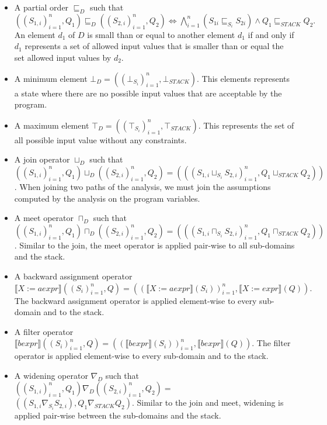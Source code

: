 \documentclass[10pt]{report}
\begin{document}
\begin{itemize}
	\item A partial order $\sqsubseteq_{D}$ such that $ ((S_{1,i})_{i=1}^{n}, Q_{1}) \sqsubseteq_{D} ((S_{2, i})_{i=1}^{n}, Q_{2}) \Longleftrightarrow \bigwedge\limits_{i=1}^{n}(S_{1i} \sqsubseteq_{S_{i}} S_{2i}) \wedge Q_{1} \sqsubseteq_{STACK} Q_{2} .$ An element $ d_{1} $ of $ D $ is small than or equal to another element $ d_{1} $ if and only if $ d_{1} $ represents a set of allowed input values that is smaller than or equal the set allowed input values by $ d_{2} $. 
	\item A minimum element $\bot_{D} = ((\bot_{S_{i}})_{i=1}^{n}, \bot_{STACK})$. This elements represents a state where there are no possible input values that are acceptable by the program. 
	\item A maximum element $\top_{D} =  ((\top_{S_{i}})_{i=1}^{n}, \top_{STACK})$. This represents the set of all possible input value without any constraints. 
	\item A join operator $\sqcup_{D}$ such that $ ((S_{1,i})_{i=1}^{n}, Q_{1}) \sqcup_{D} ((S_{2,i})_{i=1}^{n}, Q_{2}) = (((S_{1,i} \sqcup_{S_{i}} S_{2,i})_{i=1}^{n}, Q_{1} \sqcup_{STACK} Q_{2}))$. When joining two paths of the analysis, we must join the assumptions computed by the analysis on the program variables. 
	\item A meet operator $\sqcap_{D}$ such that $ ((S_{1,i})_{i=1}^{n}, Q_{1}) \sqcap_{D} ((S_{2,i})_{i=1}^{n}, Q_{2}) = (((S_{1,i} \sqcap_{S_{i}} S_{2,i})_{i=1}^{n}, Q_{1} \sqcap_{STACK} Q_{2}))$. Similar to the join, the meet operator is applied pair-wise to all sub-domains and the stack.
	\item A backward assignment operator $\llbracket X:=aexpr \rrbracket ((S_{i})_{i=1}^{n}, Q) =  ((\llbracket X:=aexpr \rrbracket(S_{i}))_{i=1}^{n}, \llbracket X:= expr \rrbracket(Q)).$ The backward assignment operator is applied element-wise to every sub-domain and to the stack. 
	\item A filter operator $ \llbracket bexpr \rrbracket ((S_{i})_{i=1}^{n}, Q) =  ((\llbracket bexpr \rrbracket(S_{i}))_{i=1}^{n}, \llbracket bexpr \rrbracket(Q)). $ The filter operator is applied element-wise to every sub-domain and to the stack.
	\item A widening operator $\nabla_{D}$ such that $ ((S_{1,i})_{i=1}^{n}, Q_{1}) \nabla_{D} ((S_{2,i})_{i=1}^{n}, Q_{2}) = $ $ ((S_{1, i} \nabla_{S_{i}} S_{2,i}), Q_{1} \nabla_{STACK} Q_{2}) .$ Similar to the join and meet, widening is applied pair-wise between the sub-domains and the stack. 
\end{itemize}
\end{document}
